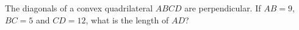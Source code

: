 The diagonals of a convex quadrilateral $ABCD$ are perpendicular. If $AB=9$, $BC=5$ and $CD=12$, what is the length of $AD$?
